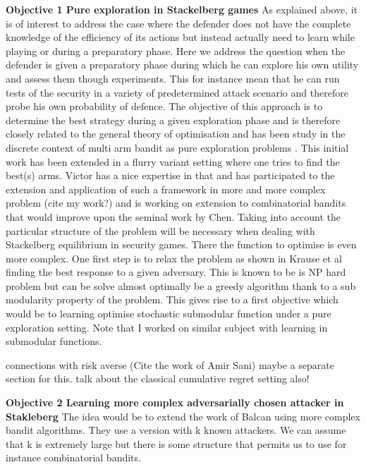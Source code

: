 \documentclass[a4paper,11pt]{article}
\renewcommand{\cite}{\autocite} %
\begin{document}
\textbf{Objective 1 Pure exploration in Stackelberg games}
As explained above, it is of interest to address the case where the  defender does not have the complete knowledge of  the efficiency of its actions  but instead actually need to learn while playing or during a preparatory phase. Here we address the question when the defender is given a preparatory phase during which he can explore his own utility and assess them though experiments. This for instance mean that he can run tests of the security in a variety of predetermined attack scenario and therefore  probe his own probability of defence. The objective of this  approach is to determine  the best strategy during a given exploration phase and  is therefore  closely related to the general theory of optimisation and has been study in the discrete context of multi arm bandit as pure exploration problems \cite{Audibert10BA}. This initial work has been extended in a flurry variant setting where one tries to find the best(s) arms.
Victor has a nice expertise in that and has participated to the extension and application of such a framework in more and more complex problem (cite my work?) and is working on extension to combinatorial bandits that would improve upon the seminal work by Chen. Taking into account the particular  structure of the problem will be necessary when dealing with Stackelberg equilibrium in security games. There the function to optimise is even more complex.
One first step is to relax the problem as shown in Krause et al finding the best response to a given adversary. This is known to be is NP hard problem  but can be solve almost optimally be a greedy algorithm thank to a sub modularity property of the problem. This gives rise to a first objective which would be to learning optimise stochastic submodular function under a pure exploration setting.
Note that I worked on similar subject with learning in submodular functions.

connections with risk averse (Cite the work of Amir Sani) maybe a separate section for this.
talk about the classical cumulative regret setting also!

\textbf{Objective 2 Learning  more complex adversarially chosen attacker in  Stakleberg}
The idea would be to  extend the work of Balcan using more complex bandit algorithms. They use a version with k known attackers. We can assume that k is extremely large but there is some  structure that permits us to use for instance combinatorial bandits.
\end{document}
